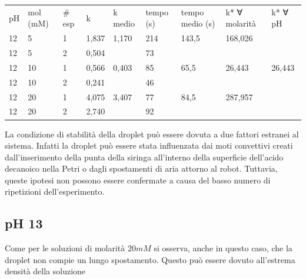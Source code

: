 \begin{center}
\begin{tabular}{lllllllll}
pH & mol (mM) & \# esp & k           & k medio     & tempo (s) & tempo medio (s) & k* ∀ molarità & k* ∀ pH     \\
12 & 5             & 1              & 1,837 & 1,170 & 214       & 143,5           & 168,026    \\
12 & 5             & 2              & 0,504 &             & 73        &                 &               &             \\
12 & 10            & 1              & 0,566 & 0,403 & 85        & 65,5            & 26,443   & 26,443 \\
12 & 10            & 2              & 0,241 &             & 46        &                 &               &             \\
12 & 20            & 1              & 4,075 & 3,407 & 77        & 84,5            & 287,957   &             \\
12 & 20            & 2              & 2,740 &             & 92        &                 &               &            
\end{tabular}
\end{center}

La condizione di stabilità della droplet può essere dovuta a due fattori estranei al sistema. Infatti la droplet può essere stata influenzata dai moti convettivi creati dall'inserimento della punta della siringa all'interno della superficie dell'acido decanoico nella Petri o dagli spostamenti di aria attorno al robot. Tuttavia, queste ipotesi non possono essere confermate a causa del basso numero di ripetizioni dell'esperimento. 

\pagebreak
\subsection{pH 13}
Come per le soluzioni di molarità $20mM$ si osserva, anche in questo caso, che la droplet non compie un lungo spostamento. Questo può essere dovuto all'estrema densità della soluzione 

